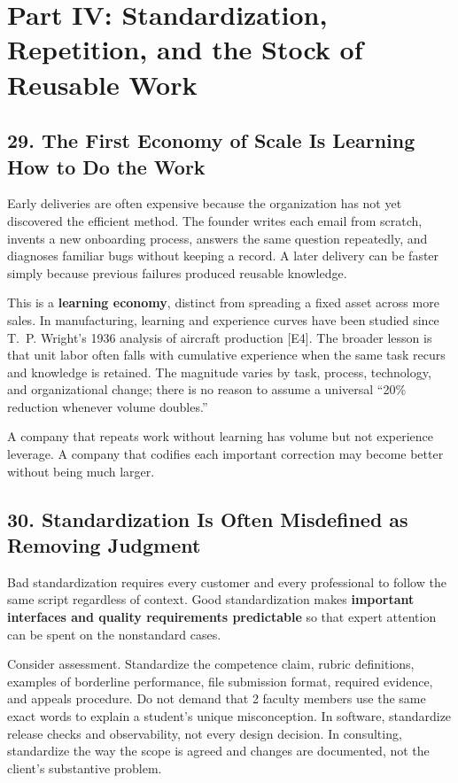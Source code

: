 \section*{Part IV: Standardization, Repetition, and the Stock of Reusable Work}

\subsection*{29. The First Economy of Scale Is Learning How to Do the Work}

Early deliveries are often expensive because the organization has not yet discovered the efficient method. The founder writes each email from scratch, invents a new onboarding process, answers the same question repeatedly, and diagnoses familiar bugs without keeping a record. A later delivery can be faster simply because previous failures produced reusable knowledge.

This is a \textbf{learning economy}, distinct from spreading a fixed asset across more sales. In manufacturing, learning and experience curves have been studied since T.~P. Wright's 1936 analysis of aircraft production [E4]. The broader lesson is that unit labor often falls with cumulative experience when the same task recurs and knowledge is retained. The magnitude varies by task, process, technology, and organizational change; there is no reason to assume a universal ``20\% reduction whenever volume doubles.''

A company that repeats work without learning has volume but not experience leverage. A company that codifies each important correction may become better without being much larger.

\subsection*{30. Standardization Is Often Misdefined as Removing Judgment}

Bad standardization requires every customer and every professional to follow the same script regardless of context. Good standardization makes \textbf{important interfaces and quality requirements predictable} so that expert attention can be spent on the nonstandard cases.

Consider assessment. Standardize the competence claim, rubric definitions, examples of borderline performance, file submission format, required evidence, and appeals procedure. Do not demand that 2 faculty members use the same exact words to explain a student's unique misconception. In software, standardize release checks and observability, not every design decision. In consulting, standardize the way the scope is agreed and changes are documented, not the client's substantive problem.

